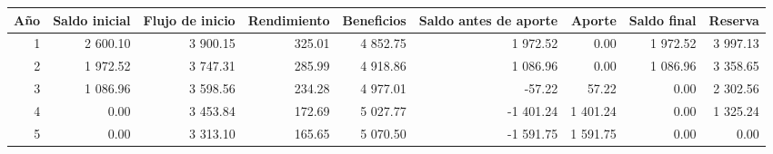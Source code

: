 \begin{tabular}{rrrrrrrrr}
\toprule
Año & Saldo inicial & Flujo de inicio & Rendimiento & Beneficios & Saldo antes de aporte & Aporte & Saldo final & Reserva \\
\midrule
1 & 2 600.10 & 3 900.15 & 325.01 & 4 852.75 & 1 972.52 & 0.00 & 1 972.52 & 3 997.13 \\
2 & 1 972.52 & 3 747.31 & 285.99 & 4 918.86 & 1 086.96 & 0.00 & 1 086.96 & 3 358.65 \\
3 & 1 086.96 & 3 598.56 & 234.28 & 4 977.01 & -57.22 & 57.22 & 0.00 & 2 302.56 \\
4 & 0.00 & 3 453.84 & 172.69 & 5 027.77 & -1 401.24 & 1 401.24 & 0.00 & 1 325.24 \\
5 & 0.00 & 3 313.10 & 165.65 & 5 070.50 & -1 591.75 & 1 591.75 & 0.00 & 0.00 \\
\bottomrule
\end{tabular}
